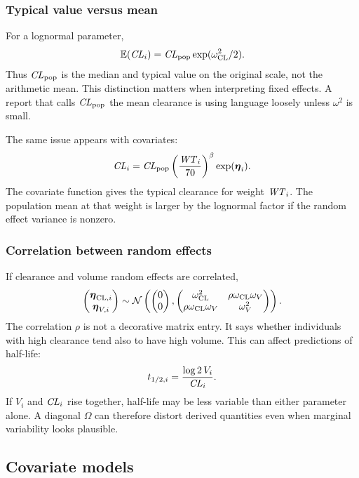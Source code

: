 \subsubsection*{Typical value versus mean}

For a lognormal parameter,
\[
  \E(\pksym{CL}_i)=\pksym{CL}_{\pop}\exp(\omega_{\pklab{CL}}^2/2).
\]
Thus \(\pksym{CL}_{\pop}\) is the median and typical value on the original scale, not the arithmetic mean.  This distinction matters when interpreting fixed effects.  A report that calls \(\pksym{CL}_{\pop}\) the mean clearance is using language loosely unless \(\omega^2\) is small.

The same issue appears with covariates:
\[
  \pksym{CL}_i=\pksym{CL}_{\pop}\left(\frac{\pksym{WT}_i}{70}\right)^\beta\exp(\reta_i).
\]
The covariate function gives the typical clearance for weight \(\pksym{WT}_i\).  The population mean at that weight is larger by the lognormal factor if the random effect variance is nonzero.

\subsubsection*{Correlation between random effects}

If clearance and volume random effects are correlated,
\[
  \begin{pmatrix}\boldsymbol{\eta}_{\mathrm{CL},i}\\ \boldsymbol{\eta}_{V,i}\end{pmatrix}
  \sim
  \mathcal{N}\left(
    \begin{pmatrix}0\\0\end{pmatrix},
    \begin{pmatrix}
      \omega_{\mathrm{CL}}^2 & \rho\omega_{\mathrm{CL}}\omega_V\\
      \rho\omega_{\mathrm{CL}}\omega_V & \omega_V^2
    \end{pmatrix}
  \right).
\]
The correlation \(\rho\) is not a decorative matrix entry.  It says whether individuals with high clearance tend also to have high volume.  This can affect predictions of half-life:
\[
  t_{1/2,i}=\frac{\log 2\,V_i}{\pksym{CL}_i}.
\]
If \(V_i\) and \(\pksym{CL}_i\) rise together, half-life may be less variable than either parameter alone.  A diagonal \(\Omega\) can therefore distort derived quantities even when marginal variability looks plausible.

\subsection{Covariate models}

